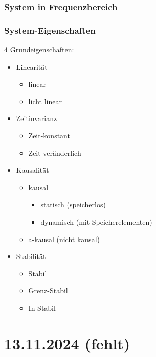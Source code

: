 \documentclass[a4paper]{article}
\begin{document}
\subsubsection*{System in Frequenzbereich}

\subsubsection*{System-Eigenschaften}
4 Grundeigenschaften:
\begin{itemize}
    \item Linearität
    \begin{itemize}
        \item linear
        \item licht linear
    \end{itemize}
    
    \item Zeitinvarianz
    \begin{itemize}
        \item Zeit-konstant
        \item Zeit-veränderlich
    \end{itemize}
    
    \item Kausalität
    \begin{itemize}
        \item kausal
        \begin{itemize}
            \item statisch (speicherlos)
            \item dynamisch (mit Speicherelementen)
        \end{itemize}
        \item a-kausal (nicht kausal)
    \end{itemize}
    
    \item Stabilität
    \begin{itemize}
        \item Stabil
        \item Grenz-Stabil
        \item In-Stabil
    \end{itemize}
\end{itemize}

\newpage
\section*{13.11.2024 (fehlt)}
\end{document}
